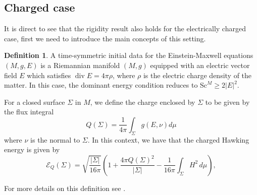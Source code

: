 \documentclass[12pt,a4paper]{amsart}
\theoremstyle{plain}
\theoremstyle{definition}
\newtheorem{definition}[theorem]{Definition}
\newcommand{\diver}{\operatorname{div}}
\begin{document}
\subsection{Charged case}

It is direct to see that the rigidity result also holds for the electrically charged case, first we need to introduce the main concepts of this setting. 

\begin{definition}\label{electrichar}
   A   time-symmetric initial data for the Einstein-Maxwell equations  $ (M,g,E)$  is a Riemannian manifold $(M,g)$ equipped with an electric vector field $E$ which satisfies $ \diver E =4 \pi \rho$, where $ \rho $  is the electric charge density of the matter. In this case, the dominant energy condition reduces to $ \mathrm{Sc}^M \geq 2 |E|^2$. 

   
For a closed surface $\Sigma$ in $M$, we define the charge enclosed by $\Sigma$ to be given by the flux
integral
\begin{equation}\label{charge}
   Q(\Sigma) = \frac{1}{4 \pi} \int_\Sigma g(E,\nu) d\mu 
\end{equation} 
where $\nu$ is the normal to $\Sigma$. In this context, we have that the charged Hawking energy is given by
\begin{equation} 
\mathcal{E}_{Q}(\Sigma) = \sqrt{\frac{|\Sigma|}{16\pi}} 
\left( 
1 + \frac{4\pi Q(\Sigma)^2}{|\Sigma|} 
- \frac{1}{16\pi} \int_{\Sigma} H^2 \, d\mu 
\right),
\end{equation}
\end{definition}
For more details on this definition see \cite{disconzi2012penrose, mccormick2019charged}.
 
\end{document}
